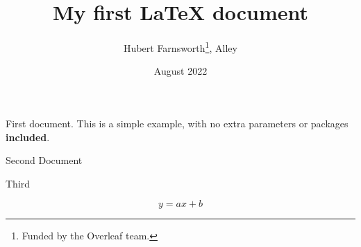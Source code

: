 \documentclass{article}
\title{My first LaTeX document}
\author{Hubert Farnsworth\thanks{Funded by the Overleaf team.}, Alley}
\date{August 2022}
\begin{document}
\maketitle
First document. This is a simple example, with no extra parameters or packages \textbf{included}.

Second Document

Third

$$
y = ax + b
$$
\end{document}
